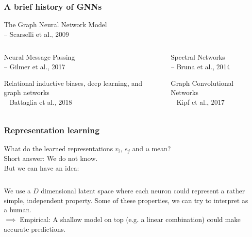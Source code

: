 \documentclass{beamer}
\begin{document}
\begin{frame}
\frametitle{A brief history of GNNs}

\begin{block}{}
The Graph Neural Network Model\\
\centering -- Scarselli et al., 2009 
\end{block}

 \begin{columns}[t]
\begin{column}{.5\textwidth}

\begin{block}{}
Neural Message Passing\\
\centering -- Gilmer et al., 2017
\end{block}
\begin{block}{}
Relational inductive biases, deep learning, and graph networks\\
\centering -- Battaglia et al., 2018
\end{block}
\end{column}
\begin{column}{.5\textwidth} 

\begin{block}{}
Spectral Networks\\
\centering -- Bruna et al., 2014
\end{block}
\begin{block}{}
Graph Convolutional Networks\\
\centering -- Kipf et al., 2017
\end{block}
\end{column}
\end{columns} 

\end{frame}

\begin{frame}
\frametitle{Representation learning}
\centering What do the learned representations $v_i$, $e_j$ and $u$ mean? \pause \\
\centering Short answer: We do not know. \pause \\ 
But we can have an idea: \pause
\bigskip 
\begin{columns}[t]
\begin{column}{.5\textwidth}
\end{column}
\begin{column}{.5\textwidth}
\end{column}
\end{columns}
\bigskip
We use a $D$ dimensional latent space where each neuron could represent a rather simple, independent property. Some of these properties, we can try to interpret as a human. \\
$\implies$ Empirical: A shallow model on top (e.g. a linear combination) could make accurate predictions.
\end{frame}
\end{document}
